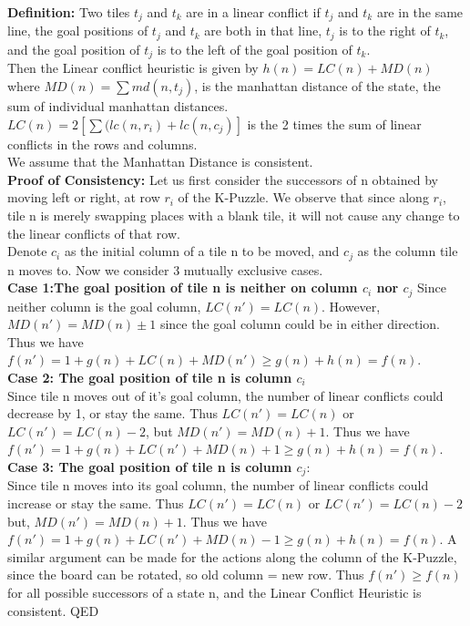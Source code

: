 \documentclass{llncs}
\begin{document}
\textbf{Definition:}
Two tiles $t_j$ and $t_k$ are in a linear conflict 
if $t_j$ and $t_k$ are in the same line, the goal positions of $t_j$ and $t_k$ 
are both in that line, $t_j$ is to the right of $t_k$, and the goal position of $t_j$
is to the left of the goal position of $t_k$. \\
Then the Linear conflict heuristic is given by $h(n) = LC(n) + MD(n)$ where $MD(n)=\sum md(n,t_j)$, is the manhattan distance of the state, the sum of individual manhattan distances. $LC(n) = 2[\sum(lc(n,r_i) +lc(n,c_j)]$ is the 2 times the sum of linear conflicts in the rows and columns. \\
We assume that the Manhattan Distance is consistent.\\
\textbf{Proof of Consistency:}
Let us first consider the successors of n obtained by moving left or right, at row $r_i$ of the K-Puzzle. We observe that since along $r_i$, tile n is merely swapping places with a blank tile, it will not cause any change to the linear conflicts of that row. \\
Denote $c_i$ as the initial column of a tile n to be moved, and $c_j$ as the column tile n moves to. Now we consider 3 mutually exclusive cases. \\
\textbf{Case 1:The goal position of tile n is neither on column $c_i$ nor $c_j$}
Since neither column is the goal column, $LC(n') = LC(n)$.
However, $MD(n') = MD(n) \pm 1$ since the goal column could be in either direction. Thus we have $f(n') = 1 + g(n) + LC(n) + MD(n') \geq  g(n) + h(n) = f(n)$. \\
\textbf{Case 2: The goal position of tile n is column $c_i$} \\
Since tile n moves out of it's goal column, the number of linear conflicts could decrease by 1, or stay the same.
Thus $LC(n') = LC(n)$ or $LC(n') = LC(n) - 2$, but $MD(n') = MD(n) + 1$. Thus we have $f(n') =1 + g(n) + LC(n') + MD(n) + 1 \geq g(n) + h(n) = f(n)$. \\
\textbf{Case 3: The goal position of tile n is column $c_j$}: \\
Since tile n moves into its goal column, the number of linear conflicts could increase or stay the same.
Thus $LC(n') = LC(n)$ or $LC(n') = LC(n) - 2$ but, $MD(n') = MD(n) + 1$. Thus we have $f(n') = 1 + g(n) + LC(n') + MD(n) - 1 \geq g(n) + h(n) = f(n)$.
A similar argument can be made for the actions along the column of the K-Puzzle, since the board can be rotated, so old column = new row.
Thus $f(n') \geq f(n)$ for all possible successors of a state n, and the Linear Conflict Heuristic is consistent. QED
\end{document}
